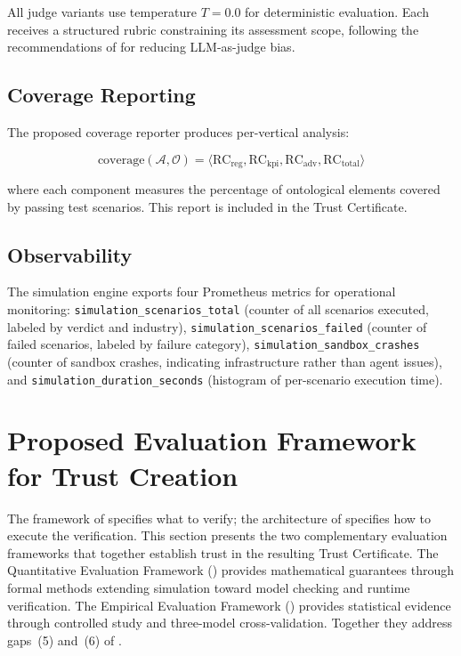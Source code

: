 \documentclass[11pt,a4paper]{article}
\newcommand{\agent}{\mathcal{A}}
\newcommand{\onto}{\mathcal{O}}
\begin{document}
\noindent All judge variants use temperature $T=0.0$ for
deterministic evaluation. Each receives a structured rubric
constraining its assessment scope, following the recommendations
of \citet{zheng2023judging} for reducing LLM-as-judge bias.

\subsection{Coverage Reporting}

The proposed coverage reporter produces per-vertical analysis:

\begin{equation}
  \text{coverage}(\agent, \onto) = \langle
    \text{RC}_{\text{reg}},
    \text{RC}_{\text{kpi}},
    \text{RC}_{\text{adv}},
    \text{RC}_{\text{total}} \rangle
\end{equation}

\noindent where each component measures the percentage of ontological
elements covered by passing test scenarios. This report is included
in the Trust Certificate.

\subsection{Observability}

The simulation engine exports four Prometheus metrics for operational
monitoring: \texttt{simulation\_scenarios\_total} (counter of all
scenarios executed, labeled by verdict and industry),
\texttt{simulation\_scenarios\_failed} (counter of failed scenarios,
labeled by failure category), \texttt{simulation\_sandbox\_crashes}
(counter of sandbox crashes, indicating infrastructure rather than
agent issues), and \texttt{simulation\_duration\_seconds} (histogram
of per-scenario execution time).

\section{Proposed Evaluation Framework for Trust Creation}
\label{sec:eval-framework}

The framework of  specifies what to
verify; the architecture of 
specifies how to execute the verification. This section presents the
two complementary evaluation frameworks that together establish trust
in the resulting Trust Certificate. The Quantitative Evaluation
Framework () provides mathematical
guarantees through formal methods extending simulation toward model
checking and runtime verification. The Empirical Evaluation Framework
() provides statistical evidence through
controlled study and three-model cross-validation. Together they
address gaps~(5) and~(6) of .
\end{document}
